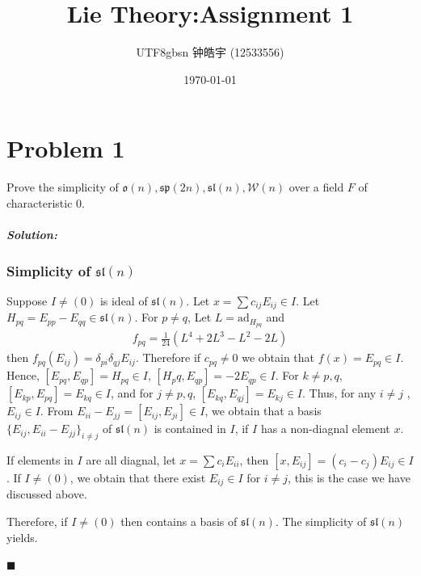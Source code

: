 \documentclass[12pt, a4paper]{article}
\title{Lie Theory:Assignment 1}
\author{
    \begin{CJK*}{UTF8}{gbsn}
    钟皓宇 (12533556)
    \end{CJK*}
}
\date{\today}
\newenvironment{solution}
  {\paragraph{\textit{Solution:}}\par\medskip}
  {\hfill$\blacksquare$\vspace{0.1cm}}
\begin{document}
\maketitle

\section*{Problem 1}
Prove the simplicity of $\mathfrak{o}(n),\mathfrak{sp}(2n),\mathfrak{sl}(n),\mathcal{W}(n)$ over a field $F$ of characteristic 0.

\begin{solution}
\subsubsection*{Simplicity of $\mathfrak{sl}(n)$}
Suppose $I\neq (0)$ is ideal of $\mathfrak{sl}(n)$. Let $x= \sum c_{ij}E_{ij} \in I$. Let $H_{pq} =E_{pp}-E_{qq} \in \mathfrak{sl}(n)$. For $p\neq q$,
Let $L= \text{ad}_{H_{pq}}$ and 
\begin{align*}
  f_{pq}= \frac{1}{24}(L^4 + 2L^3 - L^2 - 2L)
\end{align*}
then $f_{pq}(E_{ij}) = \delta_{pi}\delta_{qj}E_{ij}$. Therefore if $c_{pq}\neq 0$ we obtain that $f(x) = E_{pq} \in I$. 
Hence, $[E_{pq},E_{qp}] = H_{pq} \in I$, $[H_pq,E_{qp}]=-2 E_{qp}\in I$. For $k\neq p,q$, $[E_{kp},E_{pq}] = E_{kq}\in I$, and for $j\neq p,q$, $[E_{kq},E_{qj}]= E_{kj}\in I$. Thus, for any $i\neq j$ ,$E_{ij} \in I$. From $E_{ii}-E_{jj} = [E_{ij},E_{ji}] \in I$, we obtain that a basis $\{E_{ij},E_{ii}-E_{jj}\}_{i\neq j}$ of $\mathfrak{sl}(n)$ is contained in $I$, if $I$ has a non-diagnal element $x$.

If elements in $I$ are all diagnal, let $x = \sum c_i E_{ii}$, then $[x,E_{ij}] = (c_i-c_j)E_{ij}\in I$. If $I\neq (0)$, we obtain that there exist $E_{ij}\in I$ for $i\neq j$, this is the case we have discussed above.

Therefore, if $I\neq (0)$ then contains a basis of $\mathfrak{sl}(n)$. The simplicity of $\mathfrak{sl}(n)$ yields.


\end{solution}
\end{document}
